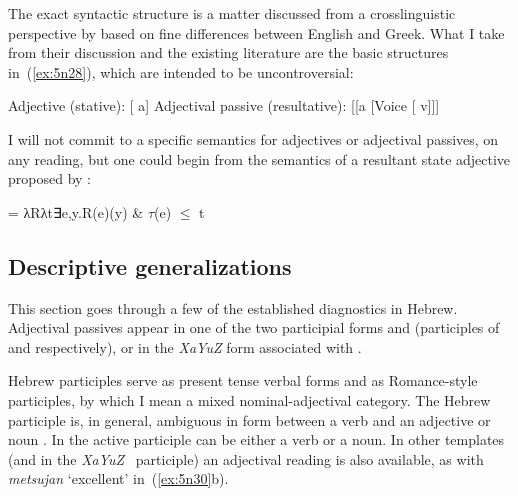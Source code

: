 \begin{exe}
\begin{xlist}
\begin{exe}
\begin{xlist}
\begin{exe}
\begin{exe}
\begin{xlist}
\begin{exe}
\begin{exe}
\begin{xlist}
\begin{exe}
\begin{xlist}
\begin{exe}
\begin{xlist}
\begin{exe}
\begin{xlist}
\begin{exe}
\begin{xlist}
\begin{xlist}
\begin{exe}
\begin{xlist}
\begin{exe}
\begin{xlist}
\begin{exe}
\begin{exe}
The exact syntactic structure is a matter discussed from a crosslinguistic perspective by \cite{alexiadouetal14,layering15} based on fine differences between English and Greek. What I take from their discussion and the existing literature are the basic structures in~(\ref{ex:5n28}), which are intended to be uncontroversial:
 \begin{exe}
 \ex  \label{ex:5n28}
 \begin{xlist} 
 	\ex  Adjective (stative): {[} a] 
 	\ex  Adjectival passive (resultative): {[}[a [Voice [ v]]] 
 \z
\z 

I will not commit to a specific semantics for adjectives or adjectival passives, on any reading, but one could begin from the semantics of a resultant state adjective proposed by \cite{kratzer00bls}:
 \begin{exe}
\ex  {} = λRλt∃e,y.R(e)(y) \& $\tau$(e) $\le$ t 
 \z 

	\subsection{Descriptive generalizations} \label{passn:adjpass:mpua}
This section goes through a few of the established diagnostics in Hebrew. Adjectival passives appear in one of the two  participial forms {\mpua} and {\mhuf} (participles of {\tpua} and {\thuf} respectively), or in the \emph{XaYuZ} form associated with \tkal.

Hebrew participles serve as present tense verbal forms and as Romance-style participles, by which I mean a mixed nominal-adjectival category. The Hebrew participle is, in general, ambiguous in form between a verb and an adjective or noun \citep{boneh13tense,doron13ehll}. In {\tkal} the active participle can be either a verb or a noun. In other templates (and in the \emph{XaYuZ}~ participle) an adjectival reading is also available, as with \emph{metsujan} `excellent' in~(\ref{ex:5n30}b).
 \begin{exe}
 \ex  \label{ex:5n30}
 \begin{xlist} 
	

\end{xlist}
\end{exe}
\end{exe}
\end{xlist}
\end{exe}
\end{exe}
\end{exe}
\end{xlist}
\end{exe}
\end{xlist}
\end{exe}
\end{xlist}
\end{xlist}
\end{exe}
\end{xlist}
\end{exe}
\end{xlist}
\end{exe}
\end{xlist}
\end{exe}
\end{xlist}
\end{exe}
\end{exe}
\end{xlist}
\end{exe}
\end{exe}
\end{xlist}
\end{exe}
\end{xlist}
\end{exe}
